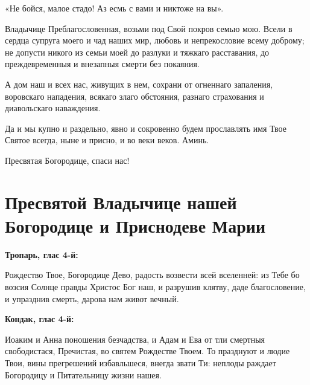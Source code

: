 «Не бойся, малое стадо! Аз есмь с вами и никтоже на вы».


Владычице Преблагословенная, возьми под Свой покров семью мою. Всели в сердца супруга моего и чад наших мир, любовь и непрекословие всему доброму;  не допусти никого из семьи моей до разлуки и тяжкаго расставания, до преждевременныя и внезапныя смерти без покаяния.

А дом наш и всех нас, живущих в нем, сохрани от огненнаго запаления, воровскаго нападения, всякаго злаго обстояния, разнаго страхования и диавольскаго наваждения.

Да и мы купно и раздельно, явно и сокровенно будем прославлять имя Твое Святое всегда, ныне и присно, и во веки веков. Аминь.


Пресвятая Богородице, спаси нас!
\mychapterending


 

{\noparindent\begin{minipage}{\textwidth}
\section{Пресвятой Владычице нашей Богородице и Приснодеве Марии}
\restoreparindent
\bfseries Тропарь, глас 4-й:\normalfont{}\nopagebreak


Рождество Твое, Богородице Дево, радость возвести всей вселенней: из Тебе бо возсия Солнце правды Христос Бог наш, и разрушив клятву, даде благословение, и упразднив смерть, дарова нам живот вечный.


\medskip


\bfseries Кондак, глас 4-й:\normalfont{}\nopagebreak


Иоаким и Анна поношения безчадства, и Адам и Ева от тли смертныя свободистася, Пречистая, во святем Рождестве Твоем. То празднуют и людие Твои, вины прегрешений избавльшеся, внегда звати Ти: неплоды раждает Богородицу и Питательницу жизни нашея.

\end{minipage}}

